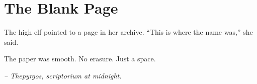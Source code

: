 \chapter*{The Blank Page}

The high elf pointed to a page in her archive. ``This is where the name was,'' she said.

The paper was smooth. No erasure. Just a space.

\smallskip

\noindent \textit{-- Thepyrgos, scriptorium at midnight.}

